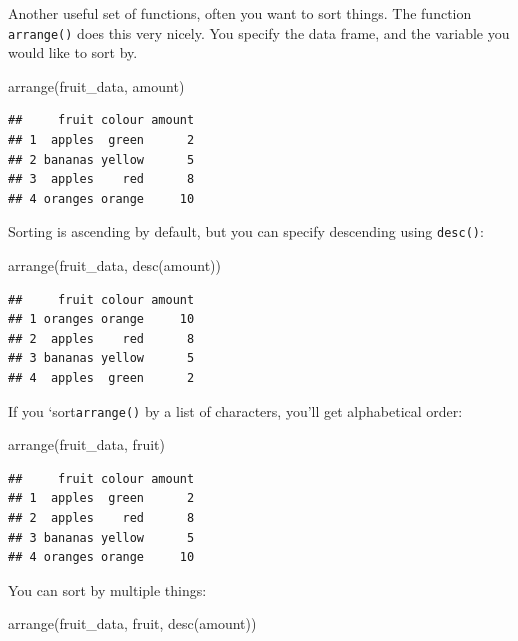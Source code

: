 \documentclass[
]{book}
\newenvironment{Shaded}{\begin{snugshade}}{\end{snugshade}}
\newcommand{\FunctionTok}[1]{\textcolor[rgb]{0.00,0.00,0.00}{#1}}
\newcommand{\NormalTok}[1]{#1}
\begin{document}
Another useful set of functions, often you want to sort things. The function \texttt{arrange()} does this very nicely. You specify the data frame, and the variable you would like to sort by.

\begin{Shaded}
\begin{Highlighting}[]
\FunctionTok{arrange}\NormalTok{(fruit\_data, amount)}
\end{Highlighting}
\end{Shaded}

\begin{verbatim}
##     fruit colour amount
## 1  apples  green      2
## 2 bananas yellow      5
## 3  apples    red      8
## 4 oranges orange     10
\end{verbatim}

Sorting is ascending by default, but you can specify descending using \texttt{desc()}:

\begin{Shaded}
\begin{Highlighting}[]
\FunctionTok{arrange}\NormalTok{(fruit\_data, }\FunctionTok{desc}\NormalTok{(amount))}
\end{Highlighting}
\end{Shaded}

\begin{verbatim}
##     fruit colour amount
## 1 oranges orange     10
## 2  apples    red      8
## 3 bananas yellow      5
## 4  apples  green      2
\end{verbatim}

If you `sort\texttt{arrange()} by a list of characters, you'll get alphabetical order:

\begin{Shaded}
\begin{Highlighting}[]
\FunctionTok{arrange}\NormalTok{(fruit\_data, fruit)}
\end{Highlighting}
\end{Shaded}

\begin{verbatim}
##     fruit colour amount
## 1  apples  green      2
## 2  apples    red      8
## 3 bananas yellow      5
## 4 oranges orange     10
\end{verbatim}

You can sort by multiple things:

\begin{Shaded}
\begin{Highlighting}[]
\FunctionTok{arrange}\NormalTok{(fruit\_data, fruit, }\FunctionTok{desc}\NormalTok{(amount))}
\end{Highlighting}
\end{Shaded}
\end{document}
